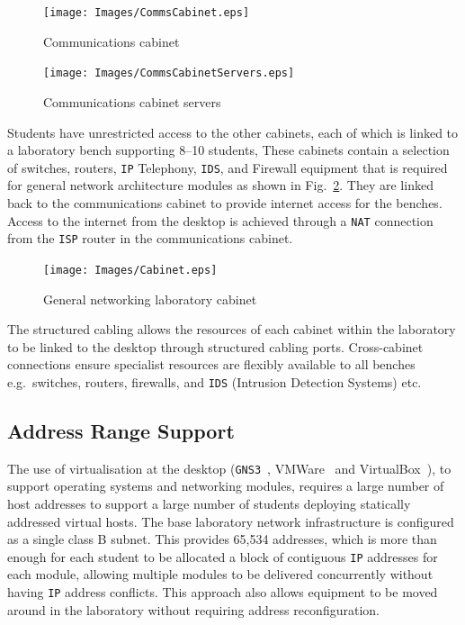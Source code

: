 \documentclass[10pt,journal]{IEEEtran}
\begin{document}
\begin{figure}[ht]
  \centering
  \begin{minipage}[ht]{0.45\textwidth}
    \texttt{[image: Images/CommsCabinet.eps]}
    \caption{Communications cabinet\label{fig:CommsCabinet}}
  \end{minipage}
  \newline
  \begin{minipage}[ht]{0.45\textwidth}
    \texttt{[image: Images/CommsCabinetServers.eps]}
    \caption{Communications cabinet servers\label{fig:CommsCabinetServers}}
  \end{minipage}
\end{figure}

Students have unrestricted access to the other cabinets, each of which is
linked to a laboratory bench supporting 8--10 students, These cabinets contain a selection of switches, routers, \texttt{IP} Telephony, \texttt{IDS}, and Firewall equipment that is required for general network architecture modules as shown in Fig.~\ref{fig:Cabinet}.
They are linked back to the communications cabinet to provide internet access
for the benches. Access to the internet from the desktop is achieved through a
\texttt{NAT} connection from the \texttt{ISP} router in the communications
cabinet. 

\begin{figure}[ht]
  \centering
  \begin{minipage}[ht]{0.45\textwidth}
    \texttt{[image: Images/Cabinet.eps]}
    \caption{General networking laboratory cabinet\label{fig:Cabinet}}
  \end{minipage}
\end{figure}

The structured cabling allows the resources of each cabinet within the
laboratory to be linked to the desktop through structured cabling ports.
Cross-cabinet connections ensure specialist resources are flexibly available to
all benches e.g.\ switches, routers, firewalls, and \texttt{IDS} (Intrusion
Detection Systems) etc.

\subsection{Address Range Support}

The use of virtualisation at the desktop (\texttt{GNS3}~\cite{GNS3:17},
VMWare~\cite{VMWARE:17} and VirtualBox~\cite{O:17}), to support operating
systems and networking modules, requires a large number of host addresses to
support a large number of students deploying statically addressed virtual
hosts. The base laboratory network infrastructure is configured as a single
class B subnet.  This provides 65,534 addresses, which is more than enough for
each student to be allocated a block of contiguous \texttt{IP} addresses for
each module, allowing multiple modules to be delivered concurrently without
having \texttt{IP} address conflicts.  This approach also allows equipment to
be moved around in the laboratory without requiring address reconfiguration.
\end{document}
